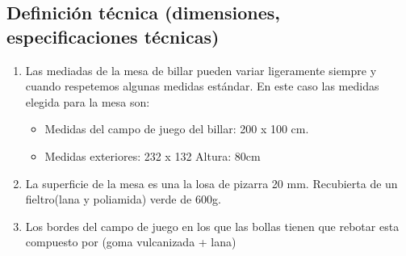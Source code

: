 	\subsection {Definición técnica (dimensiones, especificaciones técnicas)}
			\begin{enumerate}
			\item Las mediadas de la mesa de billar pueden variar ligeramente siempre y cuando respetemos algunas medidas estándar. En este caso las medidas elegida para la mesa son:
				\begin{itemize}      
				\item Medidas del campo de juego del billar: 200 x 100 cm.

				\item Medidas exteriores: 232 x 132 Altura: 80cm
				\end{itemize}
				

			\item La superficie de la mesa es una la losa de pizarra 20 mm. Recubierta de un fieltro(lana y poliamida) verde de 600g.

			\item Los bordes del campo de juego en los que las bollas tienen que rebotar esta compuesto por (goma vulcanizada + lana)
			\end{enumerate}


